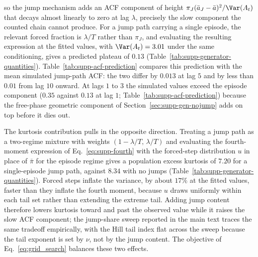 so the jump mechanism adds an ACF component of height $\pi_J (\bar a_J
- \bar a)^2 / \Var(A_t)$ that decays almost linearly to zero at lag
$\lambda$, precisely the slow component the counted chain cannot
produce. For a jump path carrying a single episode, the relevant
forced fraction is $\lambda / T$ rather than $\pi_J$, and evaluating
the resulting expression at the fitted values, with $\Var(A_t) =
3.01$ under the same conditioning, gives a predicted plateau of
$0.13$ (Table~\ref{tab:supp-generator-quantities}).
Table~\ref{tab:supp-acf-prediction} compares
this prediction with the mean simulated jump-path ACF: the two differ
by $0.013$ at lag $5$ and by less than $0.01$ from lag $10$ onward. At lags $1$ to $3$ the
simulated values exceed the episode component ($0.35$ against $0.13$
at lag $1$; Table~\ref{tab:supp-acf-prediction}) because the free-phase geometric component of
Section~\ref{sec:supp-gen-nojump} adds on top before it dies out.

\begin{table}[tbp]
\centering
\caption{\textbf{Episode-overlap prediction of the jump-path
    absolute-return autocorrelation function (ACF) against
    simulation.} The prediction evaluates
    Eq.~\eqref{eq:supp-acf-wj} at the fitted SPY values with the
    single-episode forced fraction $\lambda/T$ in place of $\pi_J$
    and the same-episode probability $h(\tau)$ of
    Eq.~\eqref{eq:supp-h}. The simulated column is the mean ACF of
    $|G_t|$ over the $99$ jump-active paths among $400$ simulated
    in-sample-length paths. The free-phase component of
    Eq.~\eqref{eq:supp-acf-nj} is excluded from the prediction; it
    has decayed below $0.01$ from lag $5$ onward.}
\label{tab:supp-acf-prediction}
\small

\end{table}

The kurtosis contribution pulls in the opposite direction. Treating a
jump path as a two-regime mixture with weights $(1 - \lambda/T,\,
\lambda/T)$ and evaluating the fourth-moment expression of
Eq.~\eqref{eq:supp-fourth} with the forced-step distribution $u$ in
place of $\bar\pi$ for the episode regime gives a population excess
kurtosis of $7.20$ for a single-episode jump path, against $8.34$
with no jumps (Table~\ref{tab:supp-generator-quantities}). Forced steps inflate the variance, by about $17\%$ at
the fitted values, faster than they inflate the fourth moment,
because $u$ draws uniformly within each tail set
rather than extending the extreme tail. Adding jump content therefore
lowers kurtosis toward and past the observed value while it raises
the slow ACF component; the jump-share sweep reported in the main
text traces the same tradeoff empirically, with the Hill tail index
flat across the sweep because the tail exponent is set by $\nu$, not
by the jump content. The objective of
Eq.~\eqref{eq:grid_search} balances these two effects.

